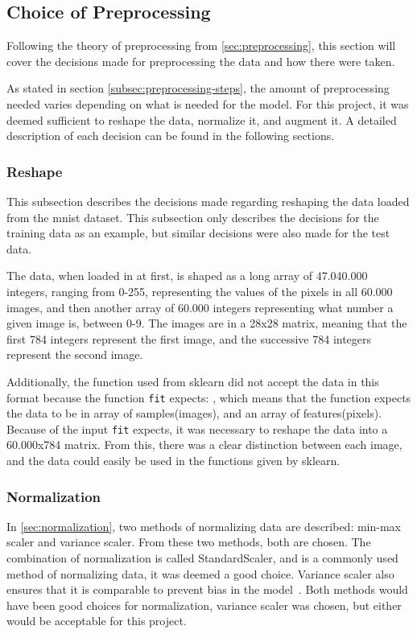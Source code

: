 \subsection{Choice of Preprocessing}
Following the theory of preprocessing from \ref{sec:preprocessing}, this section will cover the decisions made for preprocessing the data and how there were taken.

As stated in section \ref{subsec:preprocessing-steps}, the amount of preprocessing needed varies depending on what is needed for the model. For this project, it was deemed sufficient to reshape the data, normalize it, and augment it. A detailed description of each decision can be found in the following sections.

\subsubsection{Reshape}
This subsection describes the decisions made regarding reshaping the data loaded from the \gls{mnist} dataset. This subsection only describes the decisions for the training data as an example, but similar decisions were also made for the test data.

The data, when loaded in at first, is shaped as a long array of 47.040.000 integers, ranging from 0-255, representing the values of the pixels in all 60.000 images, and then another array of 60.000 integers representing what number a given image is, between 0-9. The images are in a 28x28 matrix, meaning that the first 784 integers represent the first image, and the successive 784 integers represent the second image.

Additionally, the function used from \gls{sklearn} did not accept the data in this format because the function \texttt{fit} expects: , which means that the function expects the data to be in array of samples(images), and an array of features(pixels). Because of the input \texttt{fit} expects, it was necessary to reshape the data into a 60.000x784 matrix. From this, there was a clear distinction between each image, and the data could easily be used in the functions given by \gls{sklearn}.

\subsubsection{Normalization}
In \autoref{sec:normalization}, two methods of normalizing data are described: min-max scaler and variance scaler. From these two methods, both are chosen. The combination of normalization is called StandardScaler, and is a commonly used method of normalizing data, it was deemed a good choice. Variance scaler also ensures that it is comparable to prevent bias in the model~\cite{StandardScaler-towardsAi}. Both methods would have been good choices for normalization, variance scaler was chosen, but either would be acceptable for this project.

